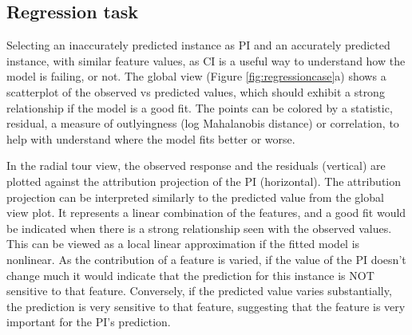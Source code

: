 \documentclass[
]{article}
\begin{document}
\hypertarget{regression-task}{%
\subsection{Regression task}\label{regression-task}}

Selecting an inaccurately predicted instance as PI and an accurately predicted instance, with similar feature values, as CI is a useful way to understand how the model is failing, or not. The global view (Figure \ref{fig:regressioncase}a) shows a scatterplot of the observed vs predicted values, which should exhibit a strong relationship if the model is a good fit. The points can be colored by a statistic, residual, a measure of outlyingness (log Mahalanobis distance) or correlation, to help with understand where the model fits better or worse.

In the radial tour view, the observed response and the residuals (vertical) are plotted against the attribution projection of the PI (horizontal). The attribution projection can be interpreted similarly to the predicted value from the global view plot. It represents a linear combination of the features, and a good fit would be indicated when there is a strong relationship seen with the observed values. This can be viewed as a local linear approximation if the fitted model is nonlinear. As the contribution of a feature is varied, if the value of the PI doesn't change much it would indicate that the prediction for this instance is NOT sensitive to that feature. Conversely, if the predicted value varies substantially, the prediction is very sensitive to that feature, suggesting that the feature is very important for the PI's prediction.
\end{document}
